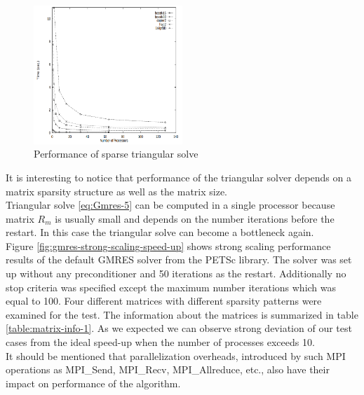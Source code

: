 \begin{figure}[htpb]
  \centering
  \includegraphics[width=0.5\textwidth]{figures/chapter-2/sparse-triangular-solve-performance.png}
\caption{Performance of sparse triangular solve \cite{sparse-la:triangular-solve}}
\label{fig:sparse-triangular-solve-performance}
\end{figure}


It is interesting to notice that performance of the triangular solver depends on a matrix sparsity structure as well as the matrix size. \\

Triangular solve \ref{eq:Gmres-5} can be computed in a single processor because matrix $R_m$ is usually small and depends on the number iterations before the restart. In this case the triangular solve can become a bottleneck again. \\

Figure \ref{fig:gmres-strong-scaling-speed-up} shows strong scaling performance results of the default GMRES solver from the PETSc library. The solver was set up without any preconditioner and 50 iterations as the restart. Additionally no stop criteria was specified except the maximum number iterations which was equal to 100. Four different matrices with different sparsity patterns were examined for the test. The information about the matrices is summarized in table \ref{table:matrix-info-1}. As we expected we can observe strong deviation of our test cases from the ideal speed-up when the number of processes exceeds 10.\\

It should be mentioned that parallelization overheads, introduced by such MPI operations as MPI\_Send, MPI\_Recv, MPI\_Allreduce, etc., also have their impact on performance of the algorithm.\\

